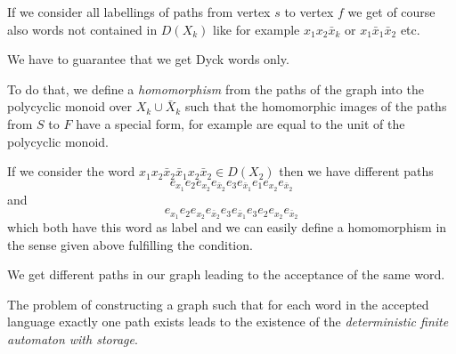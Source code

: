 If we consider all labellings of paths from vertex $s$ to vertex $f$ we get of
course also words not contained in $D(X_k)$ like for example $x_1 x_2
\bar{x}_k$ or $x_1 \bar{x}_1 \bar{x}_2$ etc.

We have to guarantee that we get Dyck words only. 

To do that, we define a {\em homomorphism} from the paths of the graph into the
polycyclic monoid over $X_k \cup \bar{X}_k$ such that the homomorphic images of
the paths from $S$ to $F$ have a special form, for example are equal to the unit
of the polycyclic monoid.

If we consider the word $ x_1 x_2 \bar{x}_2 \bar{x}_1 x_2 \bar{x}_2 \in D(X_2)$
then we have different paths 
\[e_{x_1} e_2 e_{x_2} e_{\bar{x}_2} e_3 e_{\bar{x}_1} e_1 e_{x_2} e_{\bar{x}_2} \] 
and 
\[e_{x_1} e_2 e_{x_2} e_{\bar{x}_2} e_3 e_{\bar{x}_1} e_3 e_2 e_{x_2}
e_{\bar{x}_2}\] 
which both have this word as label and we can easily define a homomorphism in
the sense given above fulfilling the condition.

We get different paths in our graph leading to the acceptance of the same word.

The problem of constructing a graph such that for each word in the accepted
language exactly one path exists leads to the existence of the {\em
deterministic finite automaton with storage}.

